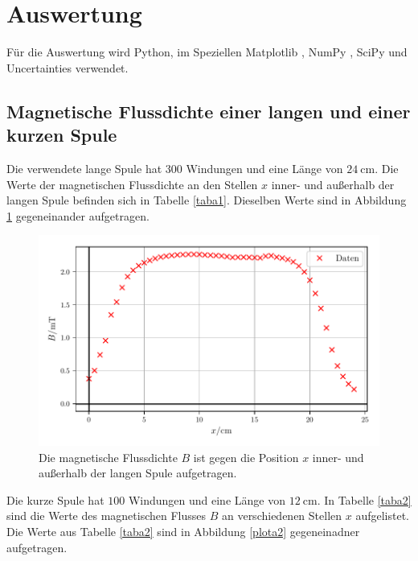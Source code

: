 \section{Auswertung}
\label{sec:Auswertung}

Für die Auswertung wird Python, im Speziellen Matplotlib \cite{matplotlib}, NumPy \cite{numpy},
SciPy \cite{scipy} und Uncertainties \cite{uncertainties} verwendet.

\subsection{Magnetische Flussdichte einer langen und einer kurzen Spule}
Die verwendete lange Spule hat $\num{300}$ Windungen und eine Länge
von $\SI{24}{\centi\meter}$. %
Die Werte der magnetischen Flussdichte an den Stellen $x$ inner- und außerhalb
der langen Spule befinden sich in Tabelle \ref{taba1}.
Dieselben Werte sind in Abbildung \ref{plota1} gegeneinander aufgetragen.




\begin{figure}
    \centering
    \includegraphics{build/plota1.pdf}
    \caption{Die magnetische Flussdichte $B$ ist gegen die Position $x$ inner- 
    und außerhalb der langen Spule aufgetragen.}
    \label{plota1}
\end{figure}

\noindent 

\noindent Die kurze Spule hat $\num{100}$ Windungen und eine Länge von
$\SI{12}{\centi\meter}$. %
In Tabelle \ref{taba2} sind die Werte des magnetischen Flusses $B$
an verschiedenen Stellen $x$ aufgelistet.
Die Werte aus Tabelle \ref{taba2} sind in Abbildung \ref{plota2}
gegeneinadner aufgetragen.


